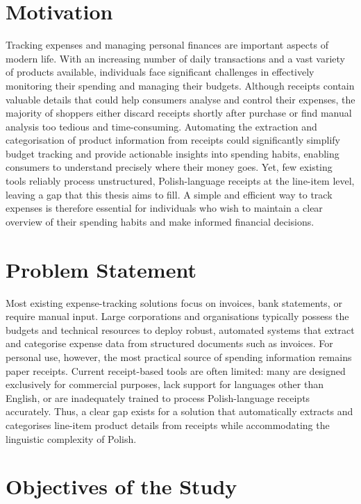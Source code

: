 \documentclass{SGGW-thesis-EN}
\begin{document}
\section{Motivation}
Tracking expenses and managing personal finances are important aspects of modern life.
With an increasing number of daily transactions and a vast variety of products available,
individuals face significant challenges in effectively monitoring their spending and managing
their budgets.
Although receipts contain valuable details that could help consumers analyse and control their
expenses, the majority of shoppers either discard receipts shortly after purchase or find manual
analysis too tedious and time-consuming.
Automating the extraction and categorisation of product information from receipts could
significantly simplify budget tracking and provide actionable insights into spending habits,
enabling consumers to understand precisely where their money goes.
Yet, few existing tools reliably process unstructured, Polish-language receipts at the line-item level,
leaving a gap that this thesis aims to fill.
A simple and efficient way to track expenses is therefore essential for individuals who wish to
maintain a clear overview of their spending habits and make informed financial decisions.

\section{Problem Statement}
Most existing expense-tracking solutions focus on invoices, bank statements, or require manual input.
Large corporations and organisations typically possess the budgets and technical resources to deploy robust,
automated systems that extract and categorise expense data from structured documents such as invoices.
For personal use, however, the most practical source of spending information remains paper receipts.
Current receipt-based tools are often limited: many are designed exclusively for commercial purposes,
lack support for languages other than English,
or are inadequately trained to process Polish-language receipts accurately.
Thus, a clear gap exists for a solution that automatically extracts and categorises line-item product details
from receipts while accommodating the linguistic complexity of Polish.


\section{Objectives of the Study}
\end{document}
